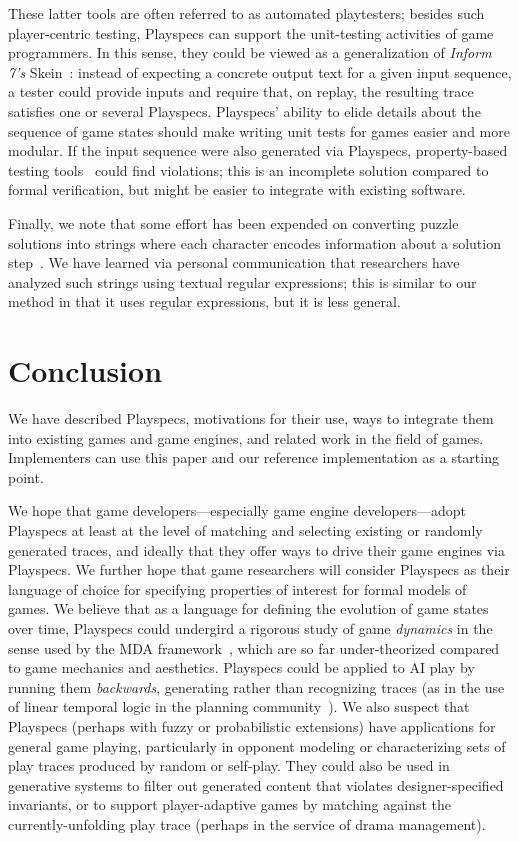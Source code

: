\documentclass[letterpaper]{article}
\begin{document}
These latter tools are often referred to as automated playtesters; besides such player-centric testing, Playspecs can support the unit-testing activities of game programmers. In this sense, they could be viewed as a generalization of \emph{Inform 7's} Skein~\cite{nelson2006natural}: instead of expecting a concrete output text for a given input sequence, a tester could provide inputs and require that, on replay, the resulting trace satisfies one or several Playspecs. Playspecs' ability to elide details about the sequence of game states should make writing unit tests for games easier and more modular. If the input sequence were also generated via Playspecs, property-based testing tools~\cite{Arts:2006:TTS:1159789.1159792,hughes2010using} could find violations; this is an incomplete solution compared to formal verification, but might be easier to integrate with existing software.

Finally, we note that some effort has been expended on converting puzzle solutions into strings where each character encodes information about a solution step~\cite{andersen2013trace}. We have learned via personal communication that researchers have analyzed such strings using textual regular expressions; this is similar to our method in that it uses regular expressions, but it is less general.

\section{Conclusion}

\noindent We have described Playspecs, motivations for their use, ways to integrate them into existing games and game engines, and related work in the field of games. Implementers can use this paper and our reference implementation as a starting point.

We hope that game developers---especially game engine developers---adopt Playspecs at least at the level of matching and selecting existing or randomly generated traces, and ideally that they offer ways to drive their game engines via Playspecs. We further hope that game researchers will consider Playspecs as their language of choice for specifying properties of interest for formal models of games. We believe that as a language for defining the evolution of game states over time, Playspecs could undergird a rigorous study of game \emph{dynamics} in the sense used by the MDA framework~\cite{hunicke2004mda}, which are so far under-theorized compared to game mechanics and aesthetics. Playspecs could be applied to AI play by running them \emph{backwards}, generating rather than recognizing traces (as in the use of linear temporal logic in the planning community~\cite{baier2006planning}). We also suspect that Playspecs (perhaps with fuzzy or probabilistic extensions) have applications for general game playing, particularly in opponent modeling or characterizing sets of play traces produced by random or self-play. They could also be used in generative systems to filter out generated content that violates designer-specified invariants, or to support player-adaptive games by matching against the currently-unfolding play trace (perhaps in the service of drama management).
\end{document}
